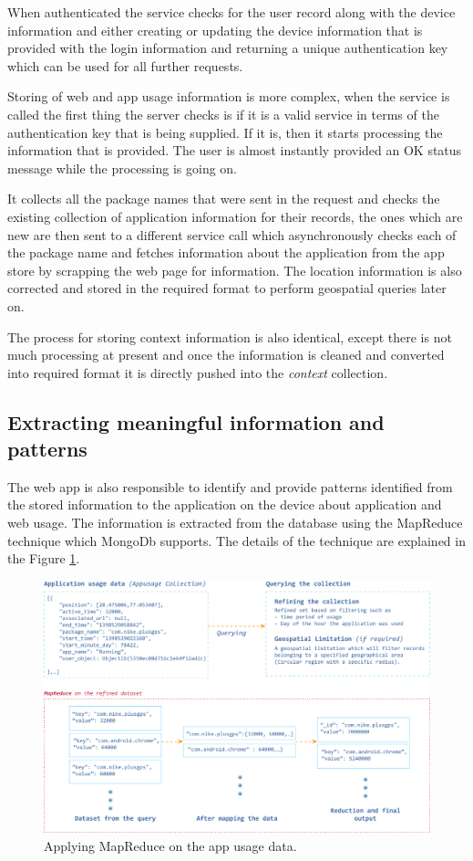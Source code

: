 \documentclass[12pt]{report}
\begin{document}
When authenticated the service checks for the user record along with the device information and either creating or updating the device information that is provided with the login information and returning a unique authentication key which can be used for all further requests.

Storing of web and app usage information is more complex, when the service is called the first thing the server checks is if it is a valid service in terms of the authentication key that is being supplied. If it is, then it starts processing the information that is provided. The user is almost instantly provided an OK status message while the processing is going on.

It collects all the package names that were sent in the request and checks the existing collection of application information for their records, the ones which are new are then sent to a different service call which asynchronously checks each of the package name and fetches information about the application from the app store by scrapping the web page for information. The location information is also corrected and stored in the required format to perform geospatial queries later on.

The process for storing context information is also identical, except there is not much processing at present and once the information is cleaned and converted into required format it is directly pushed into the \textit{context} collection.

\subsection{Extracting meaningful information and patterns}
\label{ExtractInfo}

The web app is also responsible to identify and provide patterns identified from the stored information to the application on the device about application and web usage. The information is extracted from the database using the MapReduce technique which MongoDb supports. The details of the technique are explained in the Figure \ref{figure:MapReduce}.

\begin{figure}[htbp]
 \centering
 \includegraphics[width=150mm]{MapReduce.png}
  \caption[Applying MapReduce on the app usage data.]{Applying MapReduce on the app usage data.}
 \label{figure:MapReduce}
\end{figure}
\end{document}
